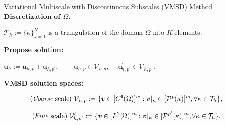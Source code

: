 \documentclass{beamer}
\newcounter{sectionframes}
\newcommand{\setsectionframes}[1]{%
  \setcounter{sectionframes}{#1}%
}
\newcounter{sectionframecount}
\begin{document}
\setsectionframes{7}


\begin{frame}[t]{Variational Multiscale with Discontinuous Subscales (VMSD) Method}
  \textbf{Discretization of $\Omega$:}

  \vspace{5pt}
  $\mathcal{T}_h := \{\kappa\}_{\kappa = 1}^K$ is a triangulation of the domain $\Omega$ into $K$ elements.


  \vspace{10pt}
  \textbf{Propose solution:}

  $\boldsymbol{u}_h := \bar{\boldsymbol{u}}_{h,p} + \boldsymbol{u}_{h,p^\prime}^\prime$, ~~~~$\bar{\boldsymbol{u}}_{h,p} \in \overline{\mathcal{V}}_{h,p}$,~~ $\boldsymbol{u}^\prime_{h,p^\prime} \in \mathcal{V}^\prime_{h,p^\prime}$.

  \vspace{10pt}
  \textbf{VMSD solution spaces:}

  \vspace{-15pt}
  \begin{equation}
    \text{(\textit{Coarse} scale) } \overline{\mathcal{V}}_{h,p} := \{\boldsymbol{v}\in [C^0(\Omega)]^m : \boldsymbol{v}|_\kappa \in [\mathcal{P}^p(\kappa)]^m, \forall \kappa \in \mathcal{T}_h\},
  \end{equation}

  \vspace{-15pt}
  \begin{equation}
    \text{(\textit{Fine} scale) } \mathcal{V}^\prime_{h,p^\prime} := \{\boldsymbol{v}\in [L^2(\Omega)]^m : \boldsymbol{v}|_\kappa \in [\mathcal{P}^{p^\prime}(\kappa)]^m, \forall \kappa \in \mathcal{T}_h\}.
  \end{equation}

\end{frame}

\end{document}

